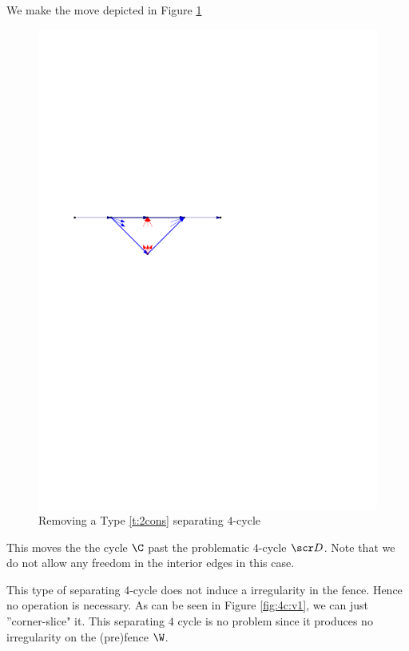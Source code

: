   We make the move depicted in Figure \ref{fig:4c:cycle_b}
  \begin{figure}[h]
    \centering
    \includegraphics[scale=1]{4cycles/img/cycle_b}
    \caption{Removing a Type \ref{t:2cons} separating $4$-cycle}
    \label{fig:4c:cycle_b}
  \end{figure}

  This moves the the cycle $\C$ past the problematic $4$-cycle $\D$. Note that we do not allow any freedom in the interior edges in this case.

  This type of separating $4$-cycle does not induce a irregularity in the fence. Hence no operation is necessary.
  As can be seen in Figure \ref{fig:4c:v1}, we can just ''corner-slice" it. This separating $4$ cycle is no problem since it produces no irregularity on the (pre)fence $\W$.

